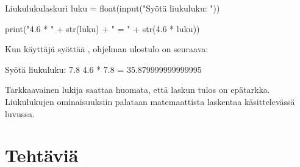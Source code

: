 \begin{example}{Liukulukulaskuri}
luku = float(input("Syötä liukuluku: "))

print("4.6 * " + str(luku) + " = " + str(4.6 * luku))
\end{example}

Kun käyttäjä syöttää , ohjelman ulostulo on seuraava:

\begin{output}
Syötä liukuluku: 7.8
4.6 * 7.8 = 35.879999999999995
\end{output}

Tarkkaavainen lukija saattaa huomata, että laskun tulos on epätarkka. Liukulukujen ominaisuuksiin palataan matemaattista laskentaa käsittelevässä luvussa.

\section{Tehtäviä}

